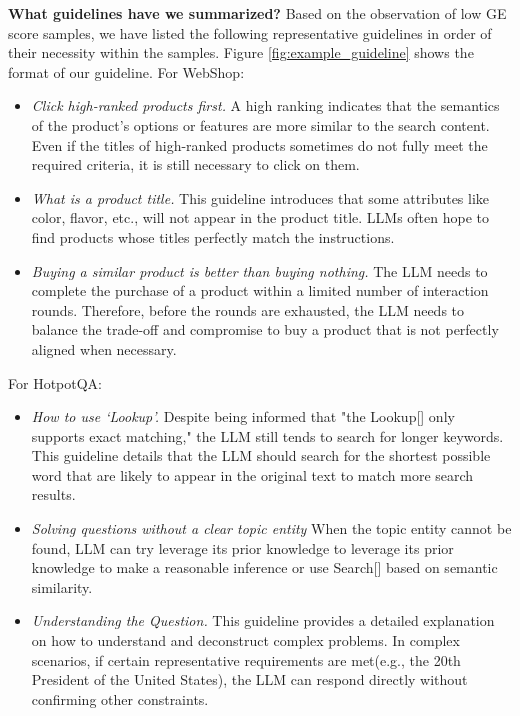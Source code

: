 \textbf{What guidelines have we summarized?} Based on the observation of low GE score samples, we have listed the following representative guidelines in order of their necessity within the samples. Figure \ref{fig:example_guideline} shows the format of our guideline. For WebShop: %
\begin{itemize}
    \item \textit{Click high-ranked products first.} A high ranking indicates that the semantics of the product's options or features are more similar to the search content. Even if the titles of high-ranked products sometimes do not fully meet the required criteria, it is still necessary to click on them.

    \item \textit{What is a product title.} This guideline introduces that some attributes like color, flavor, etc., will not appear in the product title. LLMs often hope to find products whose titles perfectly match the instructions.

    \item \textit{Buying a similar product is better than buying nothing.} The LLM needs to complete the purchase of a product within a limited number of interaction rounds. Therefore, before the rounds are exhausted, the LLM needs to balance the trade-off and compromise to buy a product that is not perfectly aligned when necessary.

    
\end{itemize}

For HotpotQA:
\begin{itemize}

    \item \textit{How to use `Lookup'.} Despite being informed that "the Lookup[] only supports exact matching," the LLM still tends to search for longer keywords. This guideline details that the LLM should search for the shortest possible word that are likely to appear in the original text to match more search results.


    \item \textit{Solving questions without a clear topic entity} When the topic entity cannot be found, LLM can try leverage its prior knowledge to leverage its prior knowledge to make a reasonable inference or use Search[] based on semantic similarity.

    \item \textit{Understanding the Question.} This guideline provides a detailed explanation on how to understand and deconstruct complex problems. In complex scenarios, if certain representative requirements are met(e.g., the 20th President of the United States), the LLM can respond directly without confirming other constraints.

\end{itemize}

